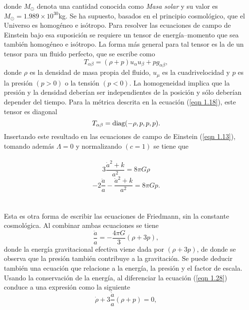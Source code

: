 \documentclass[a4paper,openright,12pt]{book}
\begin{document}
donde $M_{\odot}$ denota una cantidad conocida como \textit{Masa solar} y su valor es $M_{\odot} = 1.989 \times 10^{30}$kg. Se ha supuesto, basados en el principio cosmológico, que el Universo es homogéneo e isótropo. Para resolver las ecuaciones de campo de Einstein bajo esa suposición se requiere un tensor de energía--momento que sea también homogéneo e isótropo. La forma más general para tal tensor es la de un tensor para un fluido perfecto, que se escribe como \cite{1.2, 1.3}
\begin{equation}
T_{\alpha \beta} =
(\rho + p)u_{\alpha}u_{\beta} + pg_{\alpha \beta},\label{eqn 1.26}
\end{equation}
donde $\rho$ es la densidad de masa propia del fluido, $u_{\mu}$ es la cuadrivelocidad y $p$ es la presión $(p > 0)$ o la tensión $(p < 0)$. La homogeneidad implica que la presión y la densidad deberían ser independientes de la posición y sólo deberían depender del tiempo. Para la métrica descrita en la ecuación (\ref{eqn 1.18}), este tensor es diagonal 
\begin{equation}
T_{\alpha \beta} = \textup{diag}(-\rho, p, p, p).\label{eqn 1.27}
\end{equation}
Insertando este resultado en las ecuaciones de campo de Einstein (\ref{eqn 1.13}), tomando además $\Lambda = 0$ y normalizando $(c = 1)$ se tiene que\\\\
\begin{equation*}
 3\frac{\dot{a}^{2} + k}{a^{2}}  = 8 \pi G \rho
 \end{equation*}
\begin{equation} 
-2\frac{\ddot{a}}{a} - \frac{\dot{a}^{2} + k}{a^{2}}= 8 \pi G p.\label{eqn 1.28}
\end{equation}\\\\
Esta es otra forma de escribir las ecuaciones de Friedmann, sin la constante cosmológica. Al combinar ambas ecuaciones se tiene
\begin{equation}
\frac{\ddot{a}}{a} = -\frac{4 \pi G}{3}(\rho + 3p), \label{eqn 1.29}
\end{equation}
donde la energía gravitacional efectiva viene dada por $(\rho + 3p)$, de donde se observa que la presión también contribuye a la gravitación. Se puede deducir también una ecuación que relacione a la energía, la presión y el factor de escala. Usando la conservación de la energía, al diferenciar la ecuación (\ref{eqn 1.28}) conduce a una expresión como la siguiente
\begin{equation}
\dot{\rho} + 3\frac{\dot{a}}{a}(\rho + p) = 0,\label{eqn 1.30}
\end{equation}
\end{document}
